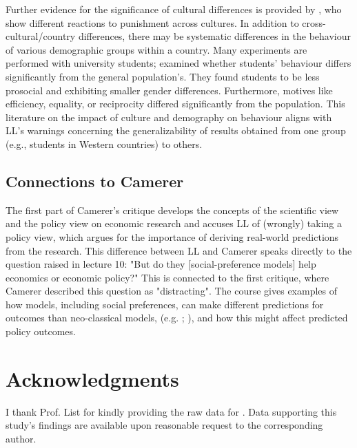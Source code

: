 \documentclass{article}
\begin{document}
Further evidence for the significance of cultural differences is provided by \citet{Herrmann.2008}, who show different reactions to punishment across cultures. 
In addition to cross-cultural/country differences, there may be systematic differences in the behaviour of various demographic groups within a country. Many experiments are performed with university students; \citet{Cappelen.2015} examined whether students' behaviour differs significantly from the general population’s. They found students to be less prosocial and exhibiting smaller gender differences. Furthermore, motives like efficiency, equality, or reciprocity differed significantly from the population. 
This literature on the impact of culture and demography on behaviour aligns with LL's warnings concerning the generalizability of results obtained from one group (e.g., students in Western countries) to others. 


\subsection*{Connections to Camerer}

The first part of Camerer's critique develops the concepts of the scientific view and the policy view on economic research and accuses LL of (wrongly) taking a policy view, which argues for the importance of deriving real-world predictions from the research. This difference between LL and Camerer speaks directly to the question raised in lecture 10: "But do they [social-preference models] help economics or economic policy?" This is connected to the first critique, where Camerer described this question as "distracting". The course gives examples of how models, including social preferences, can make different predictions for outcomes than neo-classical models, (e.g. \citet{ReyBiel.2008}; \citet{Dufwenberg.2011}), and how this might affect predicted policy outcomes. 


\section*{Acknowledgments}
I thank Prof. List for kindly providing the raw data for \cite{List.2006, list2009} . Data supporting this study's findings are available upon reasonable request to the corresponding author.






\end{document}

